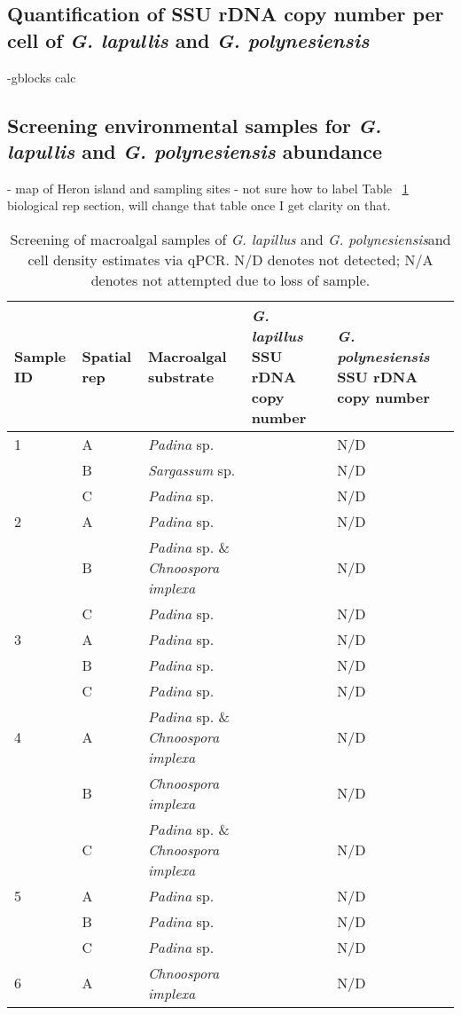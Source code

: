 \documentclass[12pt]{article}
\begin{document}
\subsection{Quantification of SSU rDNA copy number per cell of \emph{G. lapullis} and \emph{G. polynesiensis}}
-gblocks calc
\subsection{Screening environmental samples for \emph{G. lapullis} and \emph{G. polynesiensis} abundance}
- map of Heron island and sampling sites
- not sure how to label Table ~\ref{tbl:MacroalgaeTable} biological rep section, will change that table once I get clarity on that.
\FloatBarrier
\begin{longtable}{ | p{1cm} | p{1cm} | p{3cm} | p{4cm} | p{4cm} | }
\caption{Screening of macroalgal samples of \emph{G. lapillus} and \emph{G. polynesiensis}and cell density estimates via qPCR. N/D denotes not detected; N/A denotes not attempted due to loss of sample.}\\
\hline
\label{tbl:MacroalgaeTable}
\textbf{Sample ID}&\textbf{Spatial rep}&\textbf{Macroalgal substrate}&\textbf{\textit{G. lapillus} SSU rDNA copy number}&\textbf{\textit{G. polynesiensis} SSU rDNA copy number }\\
\hline
1&A&\emph{Padina} sp.&&N/D\\
\hline
&B&\emph{Sargassum} sp.&&N/D\\
\hline
&C&\emph{Padina} sp.&&N/D\\
\hline
2&A&\emph{Padina} sp.&&N/D\\
\hline
&B&\emph{Padina} sp. \& \emph{Chnoospora implexa}&&N/D\\
\hline
&C&\emph{Padina} sp.&&N/D\\
\hline
3&A&\emph{Padina} sp.&&N/D\\
\hline
&B&\emph{Padina} sp.&&N/D\\
\hline
&C&\emph{Padina} sp.&&N/D\\
\hline
4&A&\emph{Padina} sp. \& \emph{Chnoospora implexa}&&N/D\\
\hline
&B&\emph{Chnoospora implexa}&&N/D\\
\hline
&C&\emph{Padina} sp. \& \emph{Chnoospora implexa}&&N/D\\
\hline
5&A&\emph{Padina} sp.&&N/D\\
\hline
&B&\emph{Padina} sp.&&N/D\\
\hline
&C&\emph{Padina} sp.&&N/D\\
\hline
6&A&\emph{Chnoospora implexa}&&N/D\\

\end{longtable}
\end{document}
